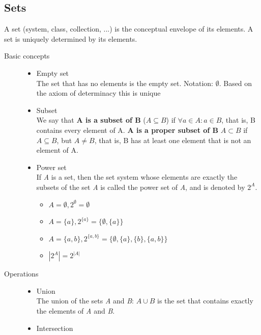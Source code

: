 \documentclass[margin=0px]{article}
\begin{document}
\subsection{Sets}
A set (system, class, collection, ...) is the conceptual envelope of its elements. A set is uniquely determined by its elements.
\begin{description}
    \item[Basic concepts] \hfill
        \begin{itemize}
            \item Empty set \\
                  The set that has no elements is the empty set. Notation: $\emptyset$. Based on the axiom of determinacy this is unique
            \item Subset \\
                  We say that \textbf{A is a subset of B} ($A \subseteq B$) if $\forall a \in A : a \in B$, that is, B contains every element of A.
                  \textbf{A is a proper subset of B} \(A \subset B\) if $A \subseteq B$, but $A \neq B$, that is, B has at least one element that is not an element of A.
            \item Power set \\
                  If {\it A} is a set, then the set system whose elements are exactly the subsets of the set {\it A} is called the power set of {\it A}, and is denoted by $2^A$.
                  \begin{itemize}
                      \item $A = \emptyset , 2^\emptyset = {\emptyset}$
                      \item $A = \{a\} , 2^{\{a\}} = \{\emptyset, \{a\}\}$
                      \item $A = \{a, b\} , 2^{\{a,b\}} = \{\emptyset, \{a\}, \{b\}, \{a, b\}\}$
                      \item $|2^A| = 2^{|A|}$
                  \end{itemize}
        \end{itemize}
    \item[Operations] \hfill
        \begin{itemize}
            \item Union \\
                  The union of the sets {\it A} and {\it B}: $A \cup B$ is the set that contains exactly the elements of {\it A} and {\it B}.
            \item Intersection \\

\end{itemize}
\end{description}
\end{document}
